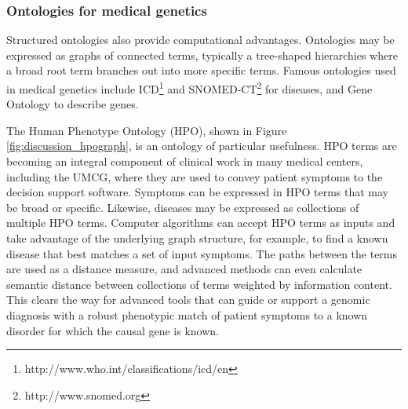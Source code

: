 \subsubsection*{Ontologies for medical genetics}

Structured ontologies also provide computational advantages.
Ontologies may be expressed as graphs of connected terms, typically a tree-shaped hierarchies where a broad root term branches out into more specific terms.
Famous ontologies used in medical genetics include ICD\footnote{http://www.who.int/classifications/icd/en} and SNOMED-CT\footnote{http://www.snomed.org} for diseases, and Gene Ontology\cite{Ashburner_2000} to describe genes.

The Human Phenotype Ontology\cite{Robinson_2010} (HPO), shown in Figure \ref{fig:discussion_hpograph}, is an ontology of particular usefulness.
HPO terms are becoming an integral component of clinical work in many medical centers, including the UMCG\cite{van_Diemen_2017}, where they are used to convey patient symptoms to the decision support software.
Symptoms can be expressed in HPO terms that may be broad or specific.
Likewise, diseases may be expressed as collections of multiple HPO terms.
Computer algorithms can accept HPO terms as inputs and take advantage of the underlying graph structure, for example, to find a known disease that best matches a set of input symptoms.
The paths between the terms are used as a distance measure, and advanced methods can even calculate semantic distance between collections of terms weighted by information content\cite{Resnik:1995:UIC:1625855.1625914}.
This clears the way for advanced tools\cite{Girdea_2013} that can guide or support a genomic diagnosis with a robust phenotypic match of patient symptoms to a known disorder for which the causal gene is known.

